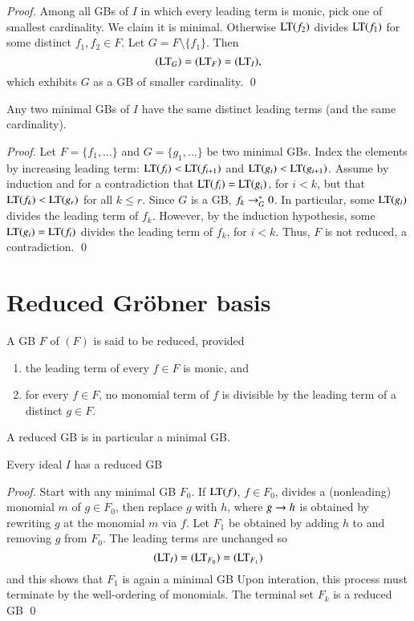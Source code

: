 \documentclass{llncs}
\begin{document}
\begin{proof}  Among all GBs of $I$ in which every leading term is monic, 
pick one of smallest cardinality.  We claim it is minimal.  
Otherwise ${\hbox{LT}}(f_2)$ divides ${\hbox{LT}}(f_1)$ for some distinct $f_1,f_2\in F$.  Let $G=F\setminus\{f_1\}$.  Then
\[
({\hbox{LT}}_{G}) = ({\hbox{LT}}_F) = ({\hbox{LT}}_I),
\]
which exhibits $G$ as a GB of smaller cardinality.
\qed
\end{proof}

\begin{lemma}  Any two minimal GBs of $I$ have the same distinct leading terms (and the same cardinality).
\end{lemma}

\begin{proof}  Let $F = \{f_1,\ldots\}$ and $G=\{g_1,\ldots\}$ be two minimal GBs.
Index the elements by increasing leading term: ${\hbox{LT}}(f_i) < {\hbox{LT}}(f_{i+1})$ and ${\hbox{LT}}(g_i)<{\hbox{LT}}(g_{i+1})$.  Assume by induction and for a contradiction that
${\hbox{LT}}(f_i)={\hbox{LT}}(g_i)$, for $i<k$, but that ${\hbox{LT}}(f_k) < {\hbox{LT}}(g_r)$ for all $k\le r$.  
Since $G$ is a GB, $f_k \rightarrow^*_G 0$.  In particular, some ${\hbox{LT}}(g_i)$ divides the leading
term of $f_k$.  However, by the induction hypothesis, some ${\hbox{LT}}(g_i)={\hbox{LT}}(f_i)$ 
divides the leading
term of $f_k$, for $i<k$.  Thus, $F$ is not reduced, a contradiction.
\qed
\end{proof}

\section{Reduced Gr\"obner basis}

A GB $F$ of $(F)$ is said to be reduced, provided
\begin{enumerate}
\item  the leading term of every $f\in F$ is monic, and
\item  for every $f\in F$, no monomial term of $f$ is divisible by the leading term of a distinct $g\in F$.
\end{enumerate}

A reduced GB is in particular a minimal GB.

\begin{lemma} Every ideal $I$ has a reduced GB
\end{lemma}

\begin{proof}
Start with any minimal GB $F_0$.  If ${\hbox{LT}}(f)$, $f\in F_0$, 
divides a (nonleading) monomial $m$ of $g\in F_0$, then 
replace $g$ with $h$, where $g\rightarrow h$
is obtained by rewriting $g$ at the monomial $m$ via $f$.   Let $F_1$ be obtained by adding $h$ to and removing $g$ from $F_0$.  The leading terms are unchanged so
\[
({\hbox{LT}}_I) = ({\hbox{LT}}_{F_0})=({\hbox{LT}}_{F_1})
\]
and this shows that $F_1$ is again a minimal GB  Upon interation, 
this process must terminate
by the well-ordering of monomials.  The terminal set $F_k$ is a reduced GB
\qed
\end{proof}
\end{document}
